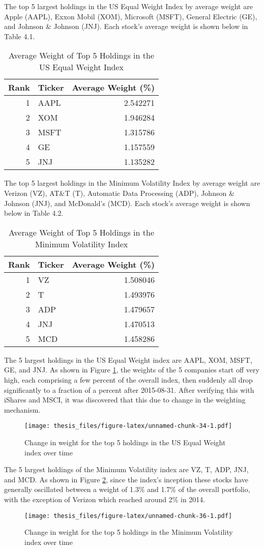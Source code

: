 \documentclass[12pt,twoside]{reedthesis}
\theoremstyle{definition}
\theoremstyle{definition}
\theoremstyle{definition}
\theoremstyle{remark}
\begin{document}
The top 5 largest holdings in the US Equal Weight Index by average
weight are Apple (AAPL), Exxon Mobil (XOM), Microsoft (MSFT), General
Electric (GE), and Johnson \& Johnson (JNJ). Each stock's average weight
is shown below in Table 4.1.
\begin{longtable}[t]{rlr}
\caption{\label{tab:unnamed-chunk-30}Average Weight of Top 5 Holdings in the US Equal Weight Index}\\
\toprule
Rank & Ticker & Average Weight (\%)\\
\midrule
1 & AAPL & 2.542271\\
2 & XOM & 1.946284\\
3 & MSFT & 1.315786\\
4 & GE & 1.157559\\
5 & JNJ & 1.135282\\
\bottomrule
\end{longtable}
The top 5 largest holdings in the Minimum Volatility Index by average
weight are Verizon (VZ), AT\&T (T), Automatic Data Processing (ADP),
Johnson \& Johnson (JNJ), and McDonald's (MCD). Each stock's average
weight is shown below in Table 4.2.
\begin{longtable}[t]{rlr}
\caption{\label{tab:unnamed-chunk-32}Average Weight of Top 5 Holdings in the Minimum Volatility Index}\\
\toprule
Rank & Ticker & Average Weight (\%)\\
\midrule
1 & VZ & 1.508046\\
2 & T & 1.493976\\
3 & ADP & 1.479657\\
4 & JNJ & 1.470513\\
5 & MCD & 1.458286\\
\bottomrule
\end{longtable}
The 5 largest holdings in the US Equal Weight index are AAPL, XOM, MSFT,
GE, and JNJ. As shown in Figure \ref{fig:plot5}, the weights of the 5
companies start off very high, each comprising a few percent of the
overall index, then suddenly all drop significantly to a fraction of a
percent after 2015-08-31. After verifying this with iShares and MSCI, it
was discovered that this due to change in the weighting
mechanism.\newline
\begin{figure}[htbp]
\centering
\texttt{[image: thesis\_files/figure-latex/unnamed-chunk-34-1.pdf]}
\caption{\label{fig:unnamed-chunk-34}Change in weight for the top 5 holdings
in the US Equal Weight index over time\label{fig:plot5}}
\end{figure}
\newline
The 5 largest holdings of the Minimum Volatility index are VZ, T, ADP,
JNJ, and MCD. As shown in Figure \ref{fig:plot6}, since the index's
inception these stocks have generally oscillated between a weight of
1.3\% and 1.7\% of the overall portfolio, with the exception of Verizon
which reached around 2\% in 2014.
\begin{figure}[htbp]
\centering
\texttt{[image: thesis\_files/figure-latex/unnamed-chunk-36-1.pdf]}
\caption{\label{fig:unnamed-chunk-36}Change in weight for the top 5 holdings
in the Minimum Volatility index over time\label{fig:plot6}}
\end{figure}
\clearpage
\end{document}
